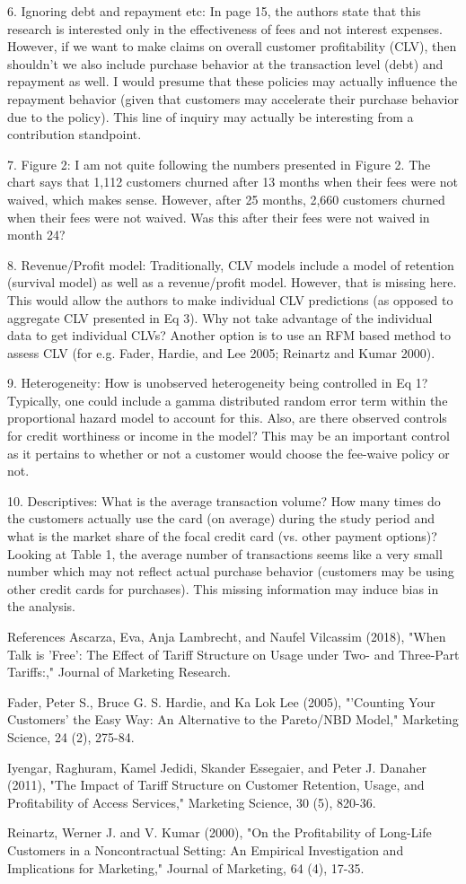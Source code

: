 \documentclass[titlepage,12pt,letterpaper]{article}
\numberwithin{equation}{section}
\begin{document}
6.	Ignoring debt and repayment etc: In page 15, the authors state that this research is interested only in the effectiveness of fees and not interest expenses. However, if we want to make claims on overall customer profitability (CLV), then shouldn't we also include purchase behavior at the transaction level (debt) and repayment as well. I would presume that these policies may actually influence the repayment behavior (given that customers may accelerate their purchase behavior due to the policy). This line of inquiry may actually be interesting from a contribution standpoint.

7.	Figure 2: I am not quite following the numbers presented in Figure 2. The chart says that 1,112 customers churned after 13 months when their fees were not waived, which makes sense. However, after 25 months, 2,660 customers churned when their fees were not waived. Was this after their fees were not waived in month 24?

8.	Revenue/Profit model: Traditionally, CLV models include a model of retention (survival model) as well as a revenue/profit model. However, that is missing here. This would allow the authors to make individual CLV predictions (as opposed to aggregate CLV presented in Eq 3). Why not take advantage of the individual data to get individual CLVs? Another option is to use an RFM based method to assess CLV (for e.g. Fader, Hardie, and Lee 2005; Reinartz and Kumar 2000).

9.	Heterogeneity: How is unobserved heterogeneity being controlled in Eq 1? Typically, one could include a gamma distributed random error term within the proportional hazard model to account for this. Also, are there observed controls for credit worthiness or income in the model? This may be an important control as it pertains to whether or not a customer would choose the fee-waive policy or not.

10.	Descriptives: What is the average transaction volume? How many times do the customers actually use the card (on average) during the study period and what is the market share of the focal credit card (vs. other payment options)? Looking at Table 1, the average number of transactions seems like a very small number which may not reflect actual purchase behavior (customers may be using other credit cards for purchases). This missing information may induce bias in the analysis.

References
Ascarza, Eva, Anja Lambrecht, and Naufel Vilcassim (2018), "When Talk is 'Free': The Effect of Tariff Structure on Usage under Two- and Three-Part Tariffs:," Journal of Marketing Research.

Fader, Peter S., Bruce G. S. Hardie, and Ka Lok Lee (2005), "'Counting Your Customers' the Easy Way: An Alternative to the Pareto/NBD Model," Marketing Science, 24 (2), 275-84.

Iyengar, Raghuram, Kamel Jedidi, Skander Essegaier, and Peter J. Danaher (2011), "The Impact of Tariff Structure on Customer Retention, Usage, and Profitability of Access Services," Marketing Science, 30 (5), 820-36.

Reinartz, Werner J. and V. Kumar (2000), "On the Profitability of Long-Life Customers in a Noncontractual Setting: An Empirical Investigation and Implications for Marketing," Journal of Marketing, 64 (4), 17-35.
\end{document}
